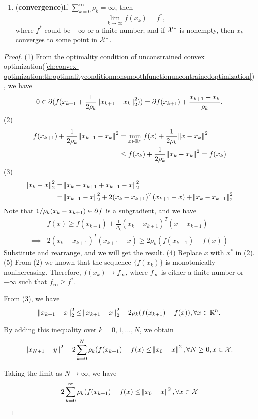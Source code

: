 \begin{refsection}
\begin{theorem}
\begin{enumerate}
	\item (\textbf{convergence})If $\sum_{k=0}^\infty \rho_k = \infty$, then $$\lim_{k\to \infty } f(x_k) = f^*,$$
	where $f^*$ could be $-\infty$ or a finite number;
	and if $\mathcal{X}^*$ is nonempty, then $x_k$ converges to some point in $\mathcal{X}^*$.
\end{enumerate}
\end{theorem}
\begin{proof}
(1) From the optimality condition of unconstrained convex optimization(\autoref{ch:convex-optimization:th:optimalityconditionnonsmoothfunctionuncontrainedoptimization}), we have
$$0 \in \partial(f(x_{k+1} + \frac{1}{2\rho_k}\norm{x_{k+1}-x_k}_2^2)) = \partial f(x_{k+1}) + \frac{x_{k+1} - x_k}{\rho_k}.$$	
(2) 
\begin{align*}
f(x_{k+1}) + \frac{1}{2\rho_k}\norm{x_{k+1}-x_k}^2 &= \min_{x\in \mathbb{R}^n} f(x) + \frac{1}{2\rho_k}\norm{x-x_k}^2 \\
&\leq f(x_k) + \frac{1}{2\rho_k}\norm{x_k-x_k}^2 = f(x_k)
\end{align*}
(3)
\begin{align*}
\norm{x_k - x}_2^2 &= \norm{x_k - x_{k+1} + x_{k+1} - x}_2^2 \\
&= \norm{x_{k+1} - x}_2^2 + 2(x_k-x_{k+1})^T(x_{k+1}-x) + \norm{x_k - x_{k+1}}_2^2
\end{align*}
Note that $1/\rho_k (x_k - x_{k+1}) \in \partial f $ is a subgradient, and we have
\begin{align*}
&f(x) \geq f(x_{k+1}) + \frac{1}{\rho_k}(x_k - x_{k+1})^T(x - x_{k+1}) \\
\implies &  2(x_k-x_{k+1})^T(x_{k+1}-x) \geq 2\rho_k(f(x_{k+1}) - f(x))
\end{align*}
Substitute and rearrange, and we will get the result.
(4) Replace $x$ with $x^*$ in (2). 	
(5) 
From (2) we known that the sequence
$\{f(x_k)\}$ is monotonically nonincreasing. Therefore, 
$f(x_k)\to f_{\infty}$, where $f_{\infty}$ is either a finite number or $-\infty$ such that $f_{\infty} \geq f^*$.

From (3), we have
$$\norm{x_{k+1}-x}_2^2 \leq \norm{x_{k+1}-x}_2^2 -2\rho_k(f(x_{k+1})-f(x)),\forall x\in \mathbb{R}^n.$$

By adding this inequality over $k=0,1,...,N$, we obtain
$$\norm{x_{N+1} - y}^2 + 2\sum_{k=0}^N \rho_k (f(x_{k+1}) - f(x) \leq \norm{x_0 - x}^2, \forall N\geq 0, x\in \mathcal{X}.$$

Taking the limit as $N\to \infty$, we have
$$2\sum_{k=0}^\infty \rho_k (f(x_{k+1}) - f(x) \leq \norm{x_0 - x}^2, \forall x\in \mathcal{X}$$


\end{proof}
\end{refsection}
